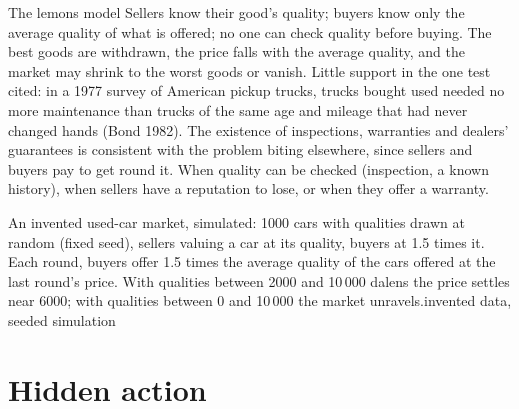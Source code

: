 \begin{model}{The lemons model}
\assumes Sellers know their good's quality; buyers know only the average quality of what is offered; no one can check quality before buying.
\predicts The best goods are withdrawn, the price falls with the average quality, and the market may shrink to the worst goods or vanish.
\tested Little support in the one test cited: in a 1977 survey of American pickup trucks, trucks bought used needed no more maintenance than trucks of
  the same age and mileage that had never changed hands (Bond 1982). The existence of inspections, warranties and dealers' guarantees is consistent with the
  problem biting elsewhere, since sellers and buyers pay to get round it.
\breaks When quality can be checked (inspection, a known history), when sellers have a reputation to lose, or when they offer a warranty.
\end{model}

\begin{omchart}{An invented used-car market, simulated: 1000 cars with qualities drawn at random (fixed seed), sellers valuing a car at its quality, buyers at 1.5 times
it. Each round, buyers offer 1.5 times the average quality of the cars offered at the last round's price. With qualities between 2000 and 10\,000 dalens the price
settles near 6000; with qualities between 0 and 10\,000 the market unravels.}{invented data, seeded simulation}
\end{omchart}

\section{Hidden action}\label{sec:g11:asymmetric-information:moral-hazard}

